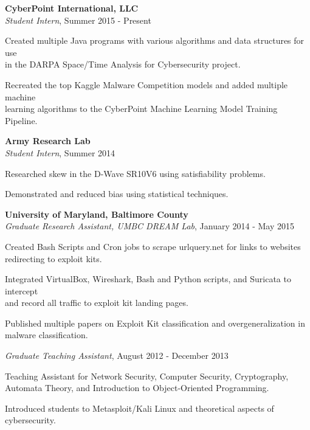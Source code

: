 \medskip
\atab \textbf{CyberPoint International, LLC}\\
\btab \textit{Student Intern}, Summer 2015 - Present\\
\begin{my_list}
\item Created multiple Java programs with various algorithms and data structures for use\\ \tab \tab in the DARPA Space/Time Analysis for Cybersecurity project.
\item Recreated the top Kaggle Malware Competition models and added multiple machine\\ \tab \tab learning algorithms to the CyberPoint Machine Learning Model Training Pipeline.
\end{my_list}

\medskip
\atab \textbf{Army Research Lab}\\
\btab \textit{Student Intern}, Summer 2014\\
\begin{my_list}
\item Researched skew in the D-Wave SR10V6 using satisfiability problems.
\item Demonstrated and reduced bias using statistical techniques.
\end{my_list}

\medskip
\atab \textbf{University of Maryland, Baltimore County}\\
\btab \textit{Graduate Research Assistant, UMBC DREAM Lab}, January 2014 - May 2015\\
\begin{my_list}
\item Created Bash Scripts and Cron jobs to scrape urlquery.net for links to websites\\ \tab \tab redirecting to exploit kits.
\item Integrated VirtualBox, Wireshark, Bash and Python scripts, and Suricata to intercept\\ \tab \tab and record all traffic to exploit kit landing pages.
\item Published multiple papers on Exploit Kit classification and overgeneralization in\\ \tab \tab malware classification.
\end{my_list}

\btab \textit{Graduate Teaching Assistant}, August 2012 - December 2013\\
\begin{my_list}
\item Teaching Assistant for Network Security, Computer Security, Cryptography,\\ \tab \tab Automata Theory, and Introduction to Object-Oriented Programming.
\item Introduced students to Metasploit/Kali Linux and theoretical aspects of cybersecurity.
\end{my_list}

